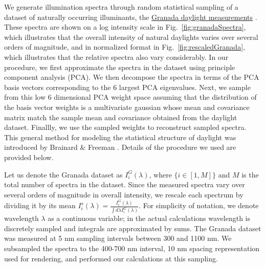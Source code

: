\documentclass{jov}
\begin{document}
We generate illumination spectra  through random statistical sampling of a dataset of naturally occurring illuminants, the \href{http://colorimaginglab.ugr.es/pages/Data}{Granada daylight measurements} \cite{peyvandi2016colorimetric}.  These spectra are shown on a log intensity scale in Fig.~\ref{fig:granadaSpectra}, which illustrates that the overall intensity of natural daylights varies over several orders of magnitude, and in normalized format in Fig.~\ref{fig:rescaledGranada}, which illustrates that the relative spectra also vary considerably.  In our procedure, we first approximate the spectra in the dataset using principle component analysis (PCA). We then decompose the spectra in terms of the PCA basis vectors corresponding to the 6 largest PCA eigenvalues. Next, we sample from this low 6 dimensional PCA weight space assuming that the distribution of the basis vector weights is a multivariate gaussian whose mean and covariance matrix match the sample mean and covariance obtained from the daylight dataset. Finallly, we use the sampled weights to reconstruct sampled spectra. This general method for modeling the statistical structure of daylight was introduced by Brainard \& Freeman \cite{BrainardFreeman}. Details of the procedure we used are provided below.

Let us denote the Granada dataset as $I^G_i(\lambda)$, where $\{i \in [1,M]\}$ and $M$ is the total number of spectra in the dataset. Since the measured spectra vary over several orders of magnitude in overall intensity, we rescale each spectrum by dividing it by its mean $I_i^s(\lambda) = \frac{I^G_i(\lambda)}{\int d\lambda I^G_i(\lambda)}$. For simplicity of notation, we denote wavelength $\lambda$ as a continuous variable; in the actual calculations wavelength is discretely sampled and integrals are approximated by sums.  The Granada dataset was measured at 5 nm sampling intervals between 300 and 1100 nm.  We subsampled the spectra to the 400-700 nm interval, 10 nm spacing representation used for rendering, and performed our calculations at this sampling.
\end{document}
